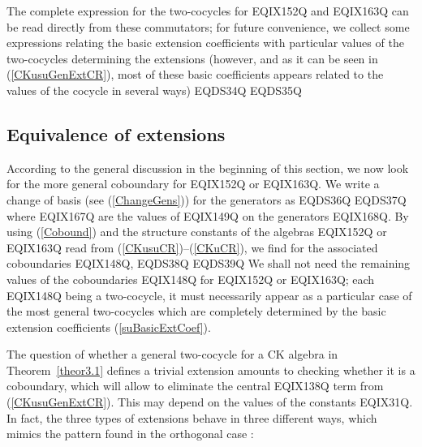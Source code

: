 The complete expression for the two-cocycles for EQIX152Q and
EQIX163Q can be read directly
from these commutators; for future convenience, we collect some
expressions relating the basic extension coefficients with
particular values of the two-cocycles determining the extensions
(however, and as it can be seen in (\ref{CKusuGenExtCR}), most of
these basic coefficients appears related to the values of the
cocycle in several ways)
EQDS34Q
EQDS35Q

\subsection{Equivalence of extensions}

According to the general discussion in the beginning of this section,
we now look for the more general coboundary for EQIX152Q or
EQIX163Q. We write a change of basis (see (\ref{ChangeGens}))
for the generators as
EQDS36Q
EQDS37Q
where EQIX167Q are the values
of EQIX149Q on the generators EQIX168Q.
By using (\ref{Cobound}) and the structure constants of the algebras
EQIX152Q or EQIX163Q
read from (\ref{CKusuCR})--(\ref{CKuCR}),
we find for the associated coboundaries EQIX148Q,
EQDS38Q
EQDS39Q
We shall not need the remaining values of the coboundaries EQIX148Q for
EQIX152Q or EQIX163Q;  each
EQIX148Q being a two-cocycle, it must necessarily appear as a
particular case of the most general two-cocycles which are completely
determined by the basic extension coefficients (\ref{suBasicExtCoef}).

The question of whether a general two-cocycle for a CK
algebra in Theorem~\ref{theor3.1} defines a trivial extension
amounts to checking whether it is a coboundary, which will allow to
eliminate the central EQIX138Q term from (\ref{CKusuGenExtCR}). This
may depend on the values of the constants EQIX31Q. In fact, the
three types of extensions  behave in three different ways, which
mimics the pattern found in the orthogonal case \cite{Azc.Her.Bue.San:96}:

